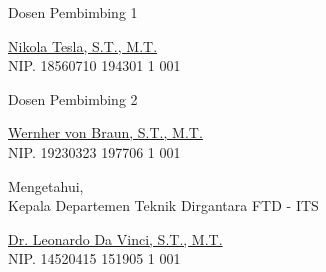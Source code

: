 \begin{center}

  \begin{multicols}{2}

    Dosen Pembimbing 1
    \vspace{12ex}

    \underline{Nikola Tesla, S.T., M.T.} \\
    NIP. 18560710 194301 1 001

    \columnbreak

    Dosen Pembimbing 2
    \vspace{12ex}

    \underline{Wernher von Braun, S.T., M.T.} \\
    NIP. 19230323 197706 1 001

  \end{multicols}
  \vspace{6ex}

  Mengetahui, \\
  Kepala Departemen Teknik Dirgantara FTD - ITS
  \vspace{12ex}

  \underline{Dr. Leonardo Da Vinci, S.T., M.T.} \\
  NIP. 14520415 151905 1 001

\end{center}
